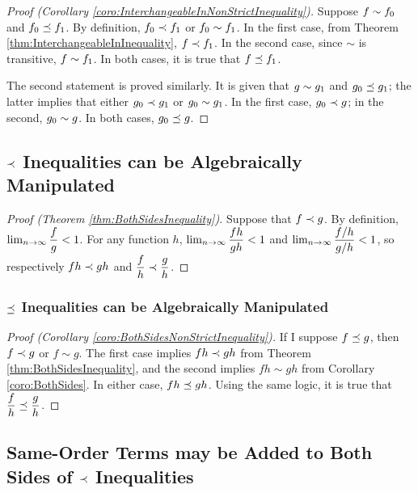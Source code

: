 \begin{proof}[Proof (Corollary \ref{coro:InterchangeableInNonStrictInequality})]
	Suppose $f \sim f_0$ and $f_0 \preceq f_1$. By definition, $f_0 \prec f_1$ or $f_0 \sim f_1$. In the first case, from Theorem \ref{thm:InterchangeableInInequality}, $f \prec f_1$. In the second case, since $\sim$ is transitive, $f \sim f_1$. In both cases, it is true that $f \preceq f_1$.
	
	The second statement is proved similarly. It is given that $g \sim g_1$ and $g_0 \preceq g_1$; the latter implies that either $g_0 \prec g_1$ or $g_0 \sim g_1$. In the first case, $g_0 \prec g$; in the second, $g_0 \sim g$. In both cases, $g_0 \preceq g$.
\end{proof}

\subsection{$\prec$ Inequalities can be Algebraically Manipulated}

\begin{proof}[Proof (Theorem \ref{thm:BothSidesInequality})]
	Suppose that $f \prec g$. By definition, $\lim_{n \to \infty} \dfrac{f}{g} < 1$. For any function $h$, $\lim_{n \to \infty} \dfrac{fh}{gh} < 1$ and $\lim_{n \to \infty} \dfrac{f / h}{g / h} < 1$, so respectively $fh \prec gh$ and $\dfrac{f}{h} \prec \dfrac{g}{h}$.
\end{proof}

\subsubsection{$\preceq$ Inequalities can be Algebraically Manipulated}

\begin{proof}[Proof (Corollary \ref{coro:BothSidesNonStrictInequality})]
	If I suppose $f \preceq g$, then $f \prec g$ or $f \sim g$. The first case implies $fh \prec gh$ from Theorem \ref{thm:BothSidesInequality}, and the second implies $fh \sim gh$ from Corollary \ref{coro:BothSides}. In either case, $fh \preceq gh$. Using the same logic, it is true that $\dfrac{f}{h} \preceq \dfrac{g}{h}$.
\end{proof}

\subsection{Same-Order Terms may be Added to Both Sides of $\prec$ Inequalities}

